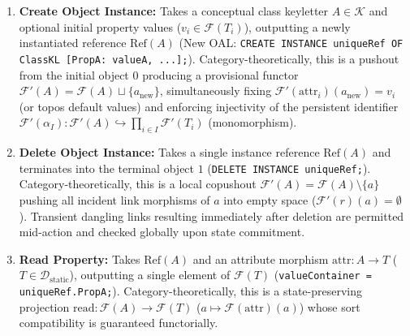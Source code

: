 \documentclass[11pt,a4paper]{article}
\theoremstyle{definition}
\theoremstyle{plain}
\theoremstyle{remark}
\newcommand{\Dstatic}{\mathcal{D}_{\mathrm{static}}}
\begin{document}
\begin{enumerate}[label=\textbf{(\arabic*)}, leftmargin=*]
    \item \textbf{Create Object Instance:}
    Takes a conceptual class keyletter $A \in \mathcal{K}$ and optional initial property values ($v_i \in \mathcal{F}(T_i)$), outputting a newly instantiated reference $\mathrm{Ref}(A)$ (New OAL: \texttt{CREATE INSTANCE uniqueRef OF ClassKL [PropA: valueA, ...];}).
    Category-theoretically, this is a pushout from the initial object $0$ producing a provisional functor $\mathcal{F}'(A) = \mathcal{F}(A) \sqcup \{a_{\mathrm{new}}\}$, simultaneously fixing $\mathcal{F}'(\mathrm{attr}_i)(a_{\mathrm{new}}) = v_i$ (or topos default values) and enforcing injectivity of the persistent identifier $\mathcal{F}'(\alpha_I) : \mathcal{F}'(A) \hookrightarrow \prod_{i \in I} \mathcal{F}'(T_i)$ (monomorphism).

    \item \textbf{Delete Object Instance:}
    Takes a single instance reference $\mathrm{Ref}(A)$ and terminates into the terminal object $1$ (\texttt{DELETE INSTANCE uniqueRef;}).
    Category-theoretically, this is a local copushout $\mathcal{F}'(A) = \mathcal{F}(A) \setminus \{a\}$ pushing all incident link morphisms of $a$ into empty space ($\mathcal{F}'(r)(a) = \emptyset$). Transient dangling links resulting immediately after deletion are permitted mid-action and checked globally upon state commitment.

    \item \textbf{Read Property:}
    Takes $\mathrm{Ref}(A)$ and an attribute morphism $\mathrm{attr} : A \to T$ ($T \in \Dstatic$), outputting a single element of $\mathcal{F}(T)$ (\texttt{valueContainer = uniqueRef.PropA;}).
    Category-theoretically, this is a state-preserving projection $\mathrm{read} : \mathcal{F}(A) \to \mathcal{F}(T)$ ($a \mapsto \mathcal{F}(\mathrm{attr})(a)$) whose sort compatibility is guaranteed functorially.


\end{enumerate}
\end{document}
